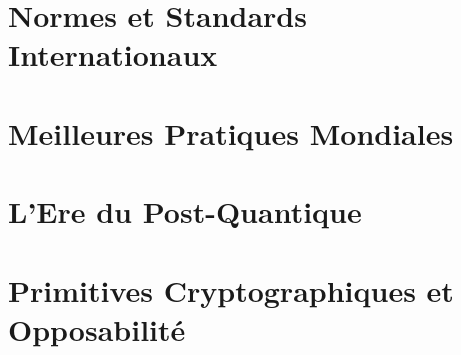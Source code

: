 \documentclass[11pt,a4paper,oneside]{book}
\begin{document}
        \part{Normes et Standards Internationaux}
        
        

        \part{Meilleures Pratiques Mondiales}
        
        

        \part{L'Ere du Post-Quantique}
        
        

        \part{Primitives Cryptographiques et Opposabilité}
        
        
\end{document}
